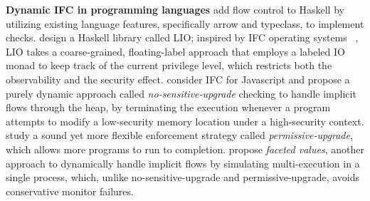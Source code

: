 \textbf{Dynamic IFC in programming languages}
\textcite{li2006encoding,LI20101974} add flow control to Haskell by utilizing
existing language features, specifically arrow and typeclass,
to implement checks.
\textcite{stefan2011flexible,stefan2012flexible,STEFAN:2017ta}
design a Haskell library called LIO;
inspired by IFC operating systems
~\parencite{efstathopoulos2005labels,zeldovich2011making,krohn2007information,vandebogart2007labels},
LIO takes a coarse-grained, floating-label approach that
employs a labeled IO monad to keep track of the current privilege level,
which restricts both the observability and the security effect.
\textcite{austin2009efficient} consider IFC for Javascript and
propose a purely dynamic approach called \textit{no-sensitive-upgrade}
checking to handle implicit flows through the heap, by terminating
the execution whenever a program attempts to modify a low-security
memory location under a high-security context.
\textcite{austin2010permissive} study a sound yet more flexible
enforcement strategy called \textit{permissive-upgrade}, which
allows more programs to run to completion.
\textcite{austin2012multiple,Austin:2017uh} propose \textit{faceted values},
another approach to dynamically handle implicit flows by simulating
multi-execution in a single process, which, unlike no-sensitive-upgrade
and permissive-upgrade, avoids conservative monitor failures.

